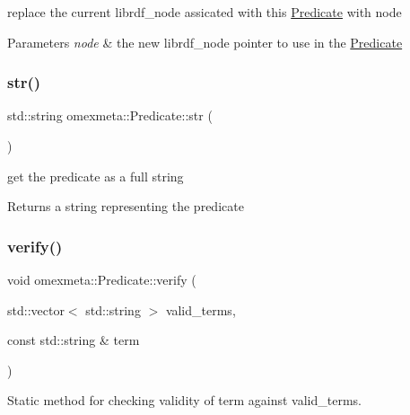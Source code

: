 replace the current librdf\+\_\+node assicated with this \hyperlink{classomexmeta_1_1Predicate}{Predicate} with node 


\begin{DoxyParams}{Parameters}
{\em node} & the new librdf\+\_\+node pointer to use in the \hyperlink{classomexmeta_1_1Predicate}{Predicate} \\
\hline
\end{DoxyParams}
\mbox{\label{classomexmeta_1_1Predicate_a9d51ebf565f39fb4d6d4f58c1b030edf}} 
\subsubsection{\texorpdfstring{str()}{str()}}
{\footnotesize\ttfamily std\+::string omexmeta\+::\+Predicate\+::str (\begin{DoxyParamCaption}{ }\end{DoxyParamCaption})}



get the predicate as a full string 

\begin{DoxyReturn}{Returns}
a string representing the predicate 
\end{DoxyReturn}
\mbox{\label{classomexmeta_1_1Predicate_a1e7e59b8a48c9f89eeec73f3bbaea19c}} 
\subsubsection{\texorpdfstring{verify()}{verify()}}
{\footnotesize\ttfamily void omexmeta\+::\+Predicate\+::verify (\begin{DoxyParamCaption}\item[{std\+::vector$<$ std\+::string $>$}]{valid\+\_\+terms,  }\item[{const std\+::string \&}]{term }\end{DoxyParamCaption})\hspace{0.3cm}{\ttfamily [static]}}



Static method for checking validity of term against valid\+\_\+terms. 


